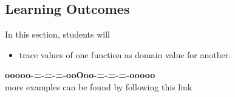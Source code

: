 \documentclass{ximera}
\begin{document}
\subsection*{Learning Outcomes}


\begin{sectionOutcomes}
In this section, students will 

\begin{itemize}
\item trace values of one function as domain value for another.

\end{itemize}
\end{sectionOutcomes}











\begin{center}
\textbf{\textcolor{green!50!black}{ooooo-=-=-=-ooOoo-=-=-=-ooooo}} \\

more examples can be found by following this link\\ 

\end{center}
\end{document}
